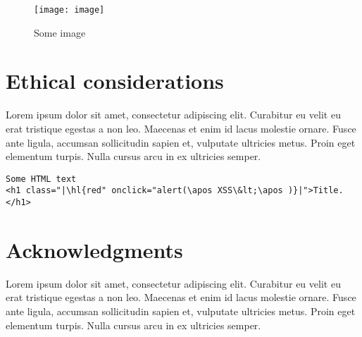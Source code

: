 \begin{figure}[h]
    \centering
    \texttt{[image: image]}
    \caption{Some image}
    \label{fig:image}
\end{figure}

\section{Ethical considerations}
Lorem ipsum dolor sit amet, consectetur adipiscing elit. Curabitur eu velit eu erat tristique egestas a non leo. Maecenas et enim id lacus molestie ornare. Fusce ante ligula, accumsan sollicitudin sapien et, vulputate ultricies metus. Proin eget elementum turpis. Nulla cursus arcu in ex ultricies semper.

\begin{lstlisting}[escapechar=|, caption=Example, label={example}]
Some HTML text
<h1 class="|\hl{red" onclick="alert(\apos XSS\&lt;\apos )}|">Title.</h1>
\end{lstlisting}

\section{Acknowledgments}
\label{acknowledgments}
Lorem ipsum dolor sit amet, consectetur adipiscing elit. Curabitur eu velit eu erat tristique egestas a non leo. Maecenas et enim id lacus molestie ornare. Fusce ante ligula, accumsan sollicitudin sapien et, vulputate ultricies metus. Proin eget elementum turpis. Nulla cursus arcu in ex ultricies semper.

